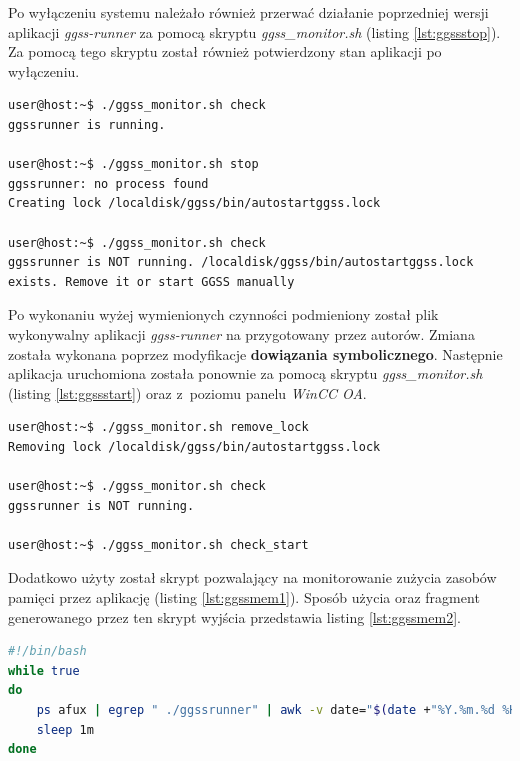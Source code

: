 \newpage
Po wyłączeniu systemu należało również przerwać działanie poprzedniej wersji aplikacji \textit{ggss-runner} za pomocą skryptu \textit{ggss\_monitor.sh} (listing \ref{lst:ggssstop}). Za pomocą tego skryptu został również potwierdzony stan aplikacji po wyłączeniu.


\begin{lstlisting}[language=Cmd, caption={Zatrzymanie działania aplikacji \textit{ggssrunner}}, label={lst:ggssstop}]
user@host:~$ ./ggss_monitor.sh check
ggssrunner is running.

user@host:~$ ./ggss_monitor.sh stop
ggssrunner: no process found
Creating lock /localdisk/ggss/bin/autostartggss.lock

user@host:~$ ./ggss_monitor.sh check
ggssrunner is NOT running. /localdisk/ggss/bin/autostartggss.lock exists. Remove it or start GGSS manually
\end{lstlisting}



Po wykonaniu wyżej wymienionych czynności podmieniony został plik wykonywalny aplikacji \textit{ggss-runner} na przygotowany przez autorów. Zmiana została wykonana poprzez modyfikacje \textbf{dowiązania symbolicznego}. Następnie aplikacja uruchomiona została ponownie za pomocą skryptu \textit{ggss\_monitor.sh} (listing \ref{lst:ggssstart}) oraz z~poziomu panelu \textit{WinCC OA}.

\begin{lstlisting}[language=Cmd, caption={Ponowne uruchomienie aplikacji \textit{ggssrunner}}, label={lst:ggssstart}]
user@host:~$ ./ggss_monitor.sh remove_lock
Removing lock /localdisk/ggss/bin/autostartggss.lock

user@host:~$ ./ggss_monitor.sh check
ggssrunner is NOT running.

user@host:~$ ./ggss_monitor.sh check_start
\end{lstlisting}


Dodatkowo użyty został skrypt pozwalający na monitorowanie zużycia zasobów pamięci przez aplikację (listing \ref{lst:ggssmem1}). Sposób użycia oraz fragment generowanego przez ten skrypt wyjścia przedstawia listing \ref{lst:ggssmem2}. 

\begin{lstlisting}[language=bash, caption={Skrypt \textit{check\_mem\_ggssrunner.sh} służacy do monitorowania pamięci używanej przez aplikację \textit{ggssrunner}}, label={lst:ggssmem1}]
#!/bin/bash
while true
do
    ps afux | egrep " ./ggssrunner" | awk -v date="$(date +"%Y.%m.%d %H:%M:%S")" '{print date, $5}'
    sleep 1m
done
\end{lstlisting}


